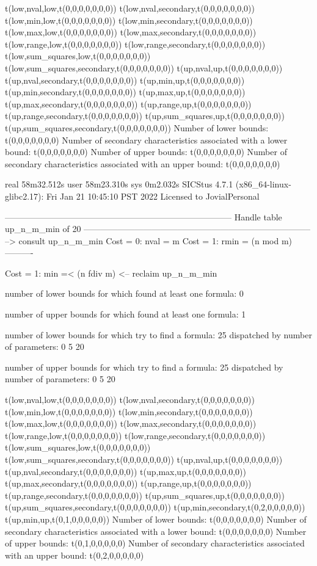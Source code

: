 t(low,nval,low,t(0,0,0,0,0,0,0))
t(low,nval,secondary,t(0,0,0,0,0,0,0))
t(low,min,low,t(0,0,0,0,0,0,0))
t(low,min,secondary,t(0,0,0,0,0,0,0))
t(low,max,low,t(0,0,0,0,0,0,0))
t(low,max,secondary,t(0,0,0,0,0,0,0))
t(low,range,low,t(0,0,0,0,0,0,0))
t(low,range,secondary,t(0,0,0,0,0,0,0))
t(low,sum_squares,low,t(0,0,0,0,0,0,0))
t(low,sum_squares,secondary,t(0,0,0,0,0,0,0))
t(up,nval,up,t(0,0,0,0,0,0,0))
t(up,nval,secondary,t(0,0,0,0,0,0,0))
t(up,min,up,t(0,0,0,0,0,0,0))
t(up,min,secondary,t(0,0,0,0,0,0,0))
t(up,max,up,t(0,0,0,0,0,0,0))
t(up,max,secondary,t(0,0,0,0,0,0,0))
t(up,range,up,t(0,0,0,0,0,0,0))
t(up,range,secondary,t(0,0,0,0,0,0,0))
t(up,sum_squares,up,t(0,0,0,0,0,0,0))
t(up,sum_squares,secondary,t(0,0,0,0,0,0,0))
Number of lower bounds:                                             t(0,0,0,0,0,0,0)
Number of secondary characteristics associated with a lower bound:  t(0,0,0,0,0,0,0)
Number of upper bounds:                                             t(0,0,0,0,0,0,0)
Number of secondary characteristics associated with an upper bound: t(0,0,0,0,0,0,0)

real	58m32.512s
user	58m23.310s
sys	0m2.032s
SICStus 4.7.1 (x86_64-linux-glibc2.17): Fri Jan 21 10:45:10 PST 2022
Licensed to JovialPersonal


--------------------------------------------------------------------------------
Handle table up_n_m_min of 20
--------------------------------------------------------------------------------
--> consult up_n_m_min
Cost =  0:  nval = m
Cost =  1:  rmin = (n mod m)
----------

Cost =  1:  min =< (n fdiv m)
<-- reclaim up_n_m_min

number of lower bounds for which found at least one formula: 0

number of upper bounds for which found at least one formula: 1

number of lower bounds for which try to find a formula: 25
dispatched by number of parameters: 0  5  20

number of upper bounds for which try to find a formula: 25
dispatched by number of parameters: 0  5  20

t(low,nval,low,t(0,0,0,0,0,0,0))
t(low,nval,secondary,t(0,0,0,0,0,0,0))
t(low,min,low,t(0,0,0,0,0,0,0))
t(low,min,secondary,t(0,0,0,0,0,0,0))
t(low,max,low,t(0,0,0,0,0,0,0))
t(low,max,secondary,t(0,0,0,0,0,0,0))
t(low,range,low,t(0,0,0,0,0,0,0))
t(low,range,secondary,t(0,0,0,0,0,0,0))
t(low,sum_squares,low,t(0,0,0,0,0,0,0))
t(low,sum_squares,secondary,t(0,0,0,0,0,0,0))
t(up,nval,up,t(0,0,0,0,0,0,0))
t(up,nval,secondary,t(0,0,0,0,0,0,0))
t(up,max,up,t(0,0,0,0,0,0,0))
t(up,max,secondary,t(0,0,0,0,0,0,0))
t(up,range,up,t(0,0,0,0,0,0,0))
t(up,range,secondary,t(0,0,0,0,0,0,0))
t(up,sum_squares,up,t(0,0,0,0,0,0,0))
t(up,sum_squares,secondary,t(0,0,0,0,0,0,0))
t(up,min,secondary,t(0,2,0,0,0,0,0))
t(up,min,up,t(0,1,0,0,0,0,0))
Number of lower bounds:                                             t(0,0,0,0,0,0,0)
Number of secondary characteristics associated with a lower bound:  t(0,0,0,0,0,0,0)
Number of upper bounds:                                             t(0,1,0,0,0,0,0)
Number of secondary characteristics associated with an upper bound: t(0,2,0,0,0,0,0)

